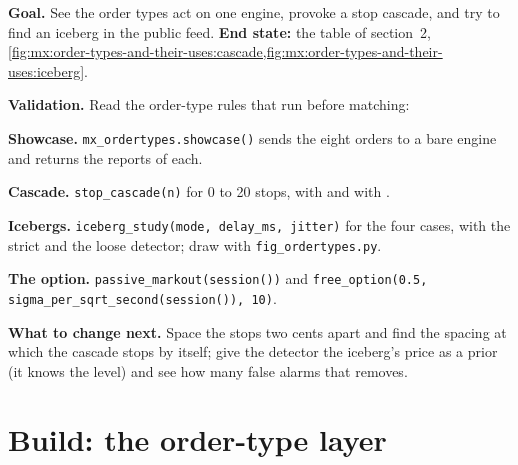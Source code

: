 \begin{tutorial}
\textbf{Goal.} See the order types act on one engine, provoke a stop cascade, and try to find an iceberg in the public feed. \textbf{End state:}
the table of section~2, \cref{fig:mx:order-types-and-their-uses:cascade,fig:mx:order-types-and-their-uses:iceberg}.
\begin{tutsteps}
\item \textbf{Validation.} Read the order-type rules that run before matching:
\label{lst:mx:order-types-and-their-uses:validate}
\item \textbf{Showcase.} \texttt{mx\_ordertypes.showcase()} sends the eight orders to a bare engine and returns the reports of each.
\item \textbf{Cascade.} \texttt{stop\_cascade(n)} for 0 to 20 stops, with  and with .
\item \textbf{Icebergs.} \texttt{iceberg\_study(mode, delay\_ms, jitter)} for the four cases, with the strict and the loose detector; draw with
\texttt{fig\_ordertypes.py}.
\item \textbf{The option.} \texttt{passive\_markout(session())} and \texttt{free\_option(0.5, sigma\_per\_sqrt\_second(session()), 10)}.
\end{tutsteps}
\textbf{What to change next.} Space the stops two cents apart and find the spacing at which the cascade stops by itself; give the detector the
iceberg's price as a prior (it knows the level) and see how many false alarms that removes.
\end{tutorial}

\section{Build: the order-type layer}\label{bld:mx:order-types-and-their-uses:ordertypes}

